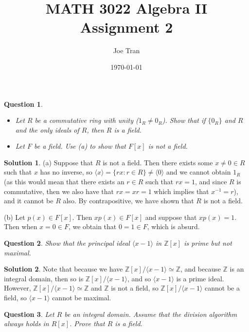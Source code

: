 \documentclass[11pt]{amsart}
\title{MATH 3022 Algebra II \\ Assignment 2}
\author{Joe Tran}
\date{\today}
\theoremstyle{}\newtheorem{question}{Question}
\theoremstyle{}\newtheorem*{bonus}{Bonus}
\theoremstyle{definition}\newtheorem*{solution}{Solution}
\newcommand{\Z}{\mathbb{Z}}
\begin{document}
\maketitle

\setcounter{question}{1}

\begin{question}
    \begin{itemize}
        \item[(a)] Let $R$ be a commutative ring with unity ($1_R \neq 0_R$). Show that if $\{0_R\}$ and $R$ and the only ideals of $R$, then $R$ is a field.
        \item[(b)] Let $F$ be a field. Use (a) to show that $F[x]$ is not a field.
    \end{itemize}
\end{question}

\begin{solution}
    (a) Suppose that $R$ is not a field. Then there exists some $x \neq 0 \in R$ such that $x$ has no inverse, so $\langle{x}\rangle = \{rx : r \in R\} \neq \langle{0}\rangle$ and we cannot obtain $1_R$ (as this would mean that there exists an $r \in R$ such that $rx = 1$, and since $R$ is commutative, then we also have that $rx = xr = 1$ which implies that $x^{-1} = r$), and it cannot be $R$ also. By contrapositive, we have shown that $R$ is not a field.
    
    (b) Let $p(x) \in F[x]$. Then $xp(x) \in F[x]$ and suppose that $xp(x) = 1$. Then when $x = 0 \in F$, we obtain that $0 = 1 \in F$, which is absurd.
\end{solution}

\begin{question}
    Show that the principal ideal $\langle{x - 1}\rangle$ in $\Z[x]$ is prime but not maximal.
\end{question}

\begin{solution}
    Note that because we have $\Z[x]/\langle{x - 1}\rangle \simeq \Z$, and because $\Z$ is an integral domain, then so is $\Z[x]/\langle{x - 1}\rangle$, and so $\langle{x - 1}\rangle$ is a prime ideal. However, $\Z[x]/\langle{x - 1}\rangle \simeq \Z$ and $\Z$ is not a field, so $\Z[x]/\langle{x - 1}\rangle$ cannot be a field, so $\langle{x - 1}\rangle$ cannot be maximal.
\end{solution}

\setcounter{question}{4}

\begin{question}
    Let $R$ be an integral domain. Assume that the division algorithm always holds in $R[x]$. Prove that $R$ is a field.
\end{question}
\end{document}
